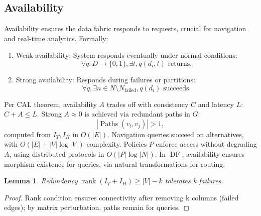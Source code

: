 \documentclass{amsart}
\newtheorem{lem}{Lemma}
\DeclareMathOperator\DF{DF}
\DeclareMathOperator\Paths{Paths}
\DeclareMathOperator\rank{rank}
\begin{document}
\subsection{Availability} \label{subsubsec:availability}
Availability ensures the data fabric responds to requests, crucial for navigation and real-time analytics. Formally:
\begin{enumerate}
    \item Weak availability: System responds eventually under normal conditions:
    \[
    \forall q: D \to \{0, 1\}, \exists t, q(d_i, t) \text{ returns}.
    \]
    \item Strong availability: Responds during failures or partitions:
    \[
    \forall q, \exists n \in N \setminus N_{\text{failed}}, q(d_i) \text{ succeeds}.
    \]
\end{enumerate}
Per CAL theorem, availability \( A \) trades off with consistency \( C \) and latency \( L \): \( C + A \leq L \). Strong \( A \approx 0 \) is achieved via redundant paths in \( G \):
\[
|\Paths(v_i, v_j)| > 1,
\]
computed from \( I_T, I_H \) in \( O(|E|) \). Navigation queries succeed on alternatives, with \( O(|E| + |V| \log |V|) \) complexity. Policies \( P \) enforce access without degrading \( A \), using distributed protocols in \( O(|P| \log |N|) \). In \( \DF \), availability ensures morphism existence for queries, via natural transformations for routing.

\begin{lem} \label{lem:availability_redundancy}
Redundancy \( \rank(I_T + I_H) \geq |V| - k \) tolerates k failures.
\end{lem}

\begin{proof}
Rank condition ensures connectivity after removing k columns (failed edges); by matrix perturbation, paths remain for queries.
\end{proof}

\end{document}
